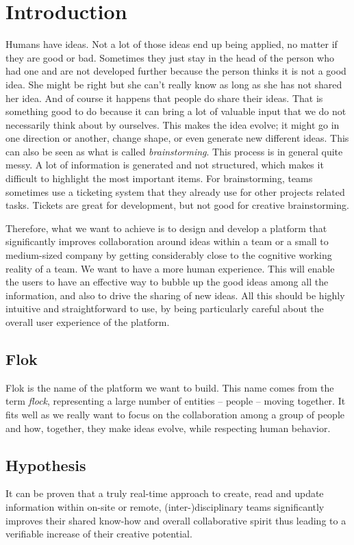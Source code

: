 \documentclass[a4paper,12pt, oneside]{article}
\begin{document}
\section{Introduction}
Humans have ideas. Not a lot of those ideas end up being applied, no matter if they are good or bad.
Sometimes they just stay in the head of the person who had one and are not developed further because the person thinks it is not a good idea.
She might be right but she can't really know as long as she has not shared her idea.
And of course it happens that people do share their ideas.
That is something good to do because it can bring a lot of valuable input that we do not necessarily think about by ourselves.
This makes the idea evolve; it might go in one direction or another, change shape, or even generate new different ideas.
This can also be seen as what is called \emph{brainstorming}. This process is in general quite messy.
A lot of information is generated and not structured, which makes it difficult to highlight the most important items.
For brainstorming, teams sometimes use a ticketing system that they already use for other projects related tasks.
Tickets are great for development, but not good for creative brainstorming.

Therefore, what we want to achieve is to design and develop a platform that significantly improves collaboration around ideas within a team or a small to medium-sized company by getting considerably close to the cognitive working reality of a team.
We want to have a more human experience.
This will enable the users to have an effective way to bubble up the good ideas among all the information, and also to drive the sharing of new ideas.
All this should be highly intuitive and straightforward to use, by being particularly careful about the overall user experience of the platform.

\subsection{Flok}
Flok is the name of the platform we want to build.
This name comes from the term \emph{flock}, representing a large number of entities – people – moving together.
It fits well as we really want to focus on the collaboration among a group of people and how, together, they make ideas evolve, while respecting human behavior.

\subsection{Hypothesis}
\label{hypothesis}
It can be proven that a truly real-time approach to create, read and update information within on-site or remote, (inter-)disciplinary teams significantly improves their shared know-how and overall collaborative spirit thus leading to a verifiable increase of their creative potential.
\end{document}
